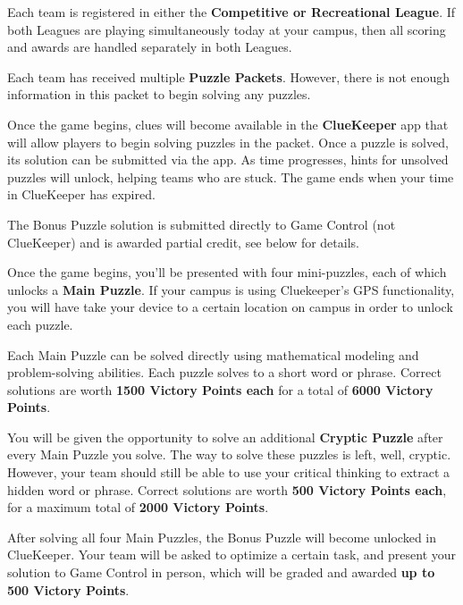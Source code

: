 
Each team is registered in either the \textbf{Competitive or Recreational League}.
If both Leagues are playing simultaneously today at your campus, then all
scoring and awards are handled separately in both Leagues.


Each team has received multiple \textbf{Puzzle Packets}. However, there is
not enough information in this packet to begin solving any puzzles.

Once the game begins, clues will become available in the \textbf{ClueKeeper} app that
will allow players to begin solving puzzles in the packet. Once a puzzle is
solved, its solution can be submitted via the app. As time progresses, hints
for unsolved puzzles will unlock, helping teams who are stuck. The game
ends when your time in ClueKeeper has expired.

The Bonus Puzzle solution is submitted directly to Game Control (not ClueKeeper)
and is awarded partial credit, see below for details.


Once the game begins, you'll be presented with four mini-puzzles, each of
which unlocks a \textbf{Main Puzzle}. If your campus is using Cluekeeper's GPS
functionality, you will have take your device to a certain location on campus
in order to unlock each puzzle.

Each Main Puzzle can be solved directly using mathematical modeling
and problem-solving abilities. Each puzzle solves to a short word or
phrase. Correct solutions are worth \textbf{1500 Victory Points each}
for a total of \textbf{6000 Victory Points}.


You will be given the opportunity to solve an additional 
\textbf{Cryptic Puzzle} after
every Main Puzzle you solve. The way to solve these puzzles is left, well,
cryptic. However, your team should still be able to use your
critical thinking to extract a hidden word or phrase. Correct
solutions are worth \textbf{500 Victory Points each},
for a maximum total of \textbf{2000 Victory Points}.


After solving all four Main Puzzles, the Bonus Puzzle will become unlocked
in ClueKeeper. Your team will be asked to optimize a certain task, and
present your solution to Game Control in person, which will be graded and
awarded \textbf{up to 500 Victory Points}. 

